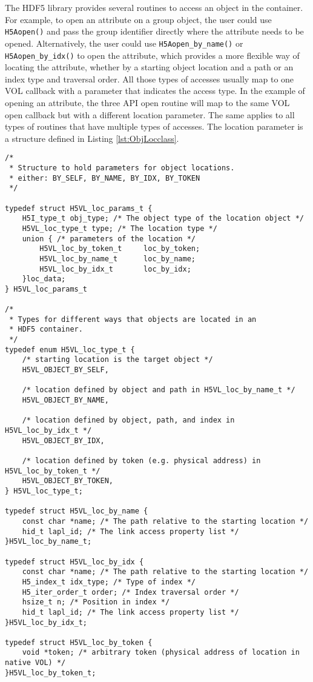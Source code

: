 The HDF5 library provides several routines to access an object in the
container. For example, to open an attribute on a group object, the
user could use \texttt{H5Aopen()} and pass the group identifier directly
where the attribute needs to be opened. Alternatively, the user could
use \texttt{H5Aopen\_by\_name()} or \texttt{H5Aopen\_by\_idx()} to open the
attribute, which provides a more flexible way of locating the
attribute, whether by a starting object location and a path or an
index type and traversal order. All those types of accesses usually
map to one VOL callback with a parameter that indicates the access
type. In the example of opening an attribute, the three API open
routine will map to the same VOL open callback but with a different
location parameter. The same applies to all types of routines that
have multiple types of accesses.  The location parameter is a
structure defined in Listing \ref{lst:ObjLocclass}.

\begin{lstlisting}[caption={Structure to hold parameters for object locations, H5VLconnector.h}, captionpos=b, label={lst:ObjLocclass}]
/* 
 * Structure to hold parameters for object locations.
 * either: BY_SELF, BY_NAME, BY_IDX, BY_TOKEN
 */

typedef struct H5VL_loc_params_t {
    H5I_type_t obj_type; /* The object type of the location object */
    H5VL_loc_type_t type; /* The location type */
    union { /* parameters of the location */
        H5VL_loc_by_token_t     loc_by_token;                                    
        H5VL_loc_by_name_t      loc_by_name;                                     
        H5VL_loc_by_idx_t       loc_by_idx;  
    }loc_data;
} H5VL_loc_params_t

/* 
 * Types for different ways that objects are located in an 
 * HDF5 container.
 */
typedef enum H5VL_loc_type_t {
    /* starting location is the target object */
    H5VL_OBJECT_BY_SELF, 

    /* location defined by object and path in H5VL_loc_by_name_t */
    H5VL_OBJECT_BY_NAME, 

    /* location defined by object, path, and index in H5VL_loc_by_idx_t */
    H5VL_OBJECT_BY_IDX,

    /* location defined by token (e.g. physical address) in H5VL_loc_by_token_t */
    H5VL_OBJECT_BY_TOKEN,
} H5VL_loc_type_t;

typedef struct H5VL_loc_by_name {
    const char *name; /* The path relative to the starting location */
    hid_t lapl_id; /* The link access property list */
}H5VL_loc_by_name_t;

typedef struct H5VL_loc_by_idx {
    const char *name; /* The path relative to the starting location */
    H5_index_t idx_type; /* Type of index */
    H5_iter_order_t order; /* Index traversal order */
    hsize_t n; /* Position in index */
    hid_t lapl_id; /* The link access property list */
}H5VL_loc_by_idx_t;

typedef struct H5VL_loc_by_token {
    void *token; /* arbitrary token (physical address of location in native VOL) */
}H5VL_loc_by_token_t;
\end{lstlisting}

